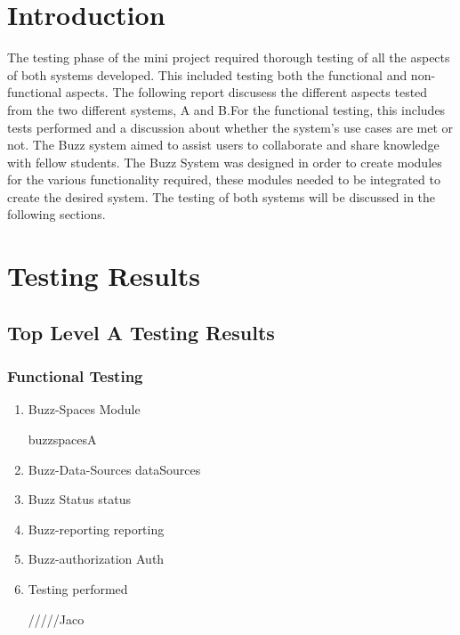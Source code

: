 \documentclass[hidelinks, 12pt, oneside]{article}
\begin{document}
\tableofcontents

\newpage

\section{Introduction}
The testing phase of the mini project required thorough testing of all the aspects of both systems developed. This included testing both the functional and non-functional aspects. The following report discusess the different aspects tested from the two different systems, A and B.For the functional testing, this includes tests performed and a discussion about whether the system's use cases are met or not. The Buzz system aimed to assist users to collaborate and share knowledge with fellow students. The Buzz System was designed in order to create modules for the various functionality required, these modules needed to be integrated to create the desired system. The testing of both systems will be discussed in the following sections.

\section{Testing Results}
\subsection{Top Level A Testing Results}
\subsubsection{Functional Testing}
\begin {enumerate}
\item Buzz-Spaces Module

 {buzzspacesA}

\item Buzz-Data-Sources
 {dataSources}

\item Buzz Status
 {status}

\item Buzz-reporting
 {reporting}

\item Buzz-authorization
 {Auth}

\item Testing performed 

/////Jaco  


\end {enumerate}
 
\end{document}
